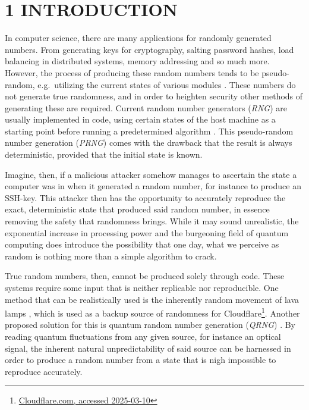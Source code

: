 \hypertarget{introduction}{%
\section{1 INTRODUCTION}\label{introduction}}

In computer science, there are many applications for randomly generated numbers. From generating keys for cryptography, salting password hashes, load balancing in distributed systems, memory addressing and so much more. However, the process of producing these random numbers tends to be pseudo-random, e.g.~utilizing the current states of various modules \cite{randomness}. These numbers do not generate true randomness, and in order to heighten security other methods of generating these are required. Current random number generators (\emph{RNG}) are usually implemented in code, using certain states of the host machine as a starting point before running a predetermined algorithm \cite{randomness}. This pseudo-random number generation (\emph{PRNG}) comes with the drawback that the result is always deterministic, provided that the initial state is known.

Imagine, then, if a malicious attacker somehow manages to ascertain the state a computer was in when it generated a random number, for instance to produce an SSH-key. This attacker then has the opportunity to accurately reproduce the exact, deterministic state that produced said random number, in essence removing the safety that randomness brings. While it may sound unrealistic, the exponential increase in processing power and the burgeoning field of quantum computing does introduce the possibility that one day, what we perceive as random is nothing more than a simple algorithm to crack.

True random numbers, then, cannot be produced solely through code. These systems require some input that is neither replicable nor reproducible. One method that can be realistically used is the inherently random movement of lava lamps \cite{lavarand}, which is used as a backup source of randomness for Cloudflare\footnote{\href{https://blog.cloudflare.com/randomness-101-lavarand-in-production/}{Cloudflare.com, accessed 2025-03-10}}. Another proposed solution for this is quantum random number generation (\emph{QRNG}) \cite{QRNG}. By reading quantum fluctuations from any given source, for instance an optical signal, the inherent natural unpredictability of said source can be harnessed in order to produce a random number from a state that is nigh impossible to reproduce accurately.

